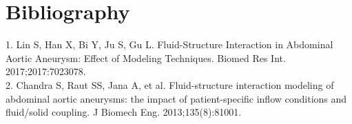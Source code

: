 \documentclass[11pt]{article}
\begin{document}
	\section*{Bibliography}
	1. Lin S, Han X, Bi Y, Ju S, Gu L. Fluid-Structure Interaction in Abdominal Aortic Aneurysm: Effect of Modeling Techniques. Biomed Res Int. 2017;2017:7023078.\\
	2. Chandra S, Raut SS, Jana A, et al. Fluid-structure interaction modeling of abdominal aortic aneurysms: the impact of patient-specific inflow conditions and fluid/solid coupling. J Biomech Eng. 2013;135(8):81001.
	
	
	
	
	
\end{document}
